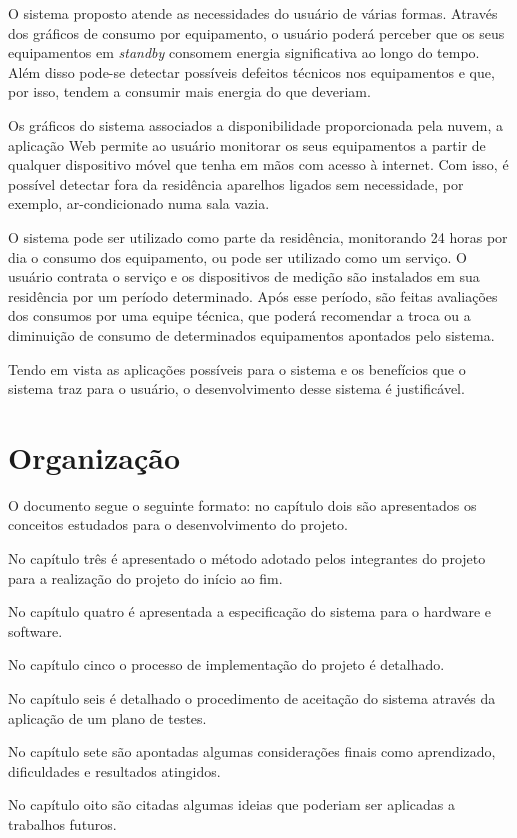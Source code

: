 O sistema proposto atende as necessidades do usuário de várias formas. Através dos gráficos de consumo por equipamento, o usuário poderá perceber que os seus equipamentos em \textit{standby} consomem energia significativa ao longo do tempo. Além disso pode-se detectar possíveis defeitos técnicos nos equipamentos e que, por isso, tendem a consumir mais energia do que deveriam.

Os gráficos do sistema associados a disponibilidade proporcionada pela nuvem, a aplicação Web permite ao usuário monitorar os seus equipamentos a partir de qualquer dispositivo móvel que tenha em mãos com acesso à internet. Com isso, é possível detectar fora da residência aparelhos ligados sem necessidade, por exemplo, ar-condicionado numa sala vazia.

O sistema pode ser utilizado como parte da residência, monitorando 24 horas por dia o consumo dos equipamento, ou pode ser utilizado como um serviço. O usuário contrata o serviço e os dispositivos de medição são instalados em sua residência por um período determinado. Após esse período, são feitas avaliações dos consumos por uma equipe técnica, que poderá recomendar a troca ou a diminuição de consumo de determinados equipamentos apontados pelo sistema.

Tendo em vista as aplicações possíveis para o sistema e os benefícios que o sistema traz para o usuário, o desenvolvimento desse sistema é justificável.

\section{Organização}
\label{Sec:organizacao}

O documento segue o seguinte formato: no capítulo dois são apresentados os conceitos estudados para o desenvolvimento do projeto.

No capítulo três é apresentado o método adotado pelos integrantes do projeto para a realização do projeto do início ao fim.

No capítulo quatro é apresentada a especificação do sistema para o hardware e software.

No capítulo cinco o processo de implementação do projeto é detalhado.

No capítulo seis é detalhado o procedimento de aceitação do sistema através da aplicação de um plano de testes.

No capítulo sete são apontadas algumas considerações finais como aprendizado, dificuldades e resultados atingidos.

No capítulo oito são citadas algumas ideias que poderiam ser aplicadas a trabalhos futuros.
